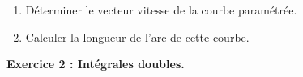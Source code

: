 \documentclass[a4paper,12pt]{article}
\begin{document}
\begin{enumerate}
\item
Déterminer le vecteur vitesse de la courbe paramétrée.
\item
Calculer la longueur de l'arc de cette courbe.
\end{enumerate}
\bigskip








\hline

\bigskip

\noindent
\textbf{Exercice 2 : Intégrales doubles.}
\end{document}
